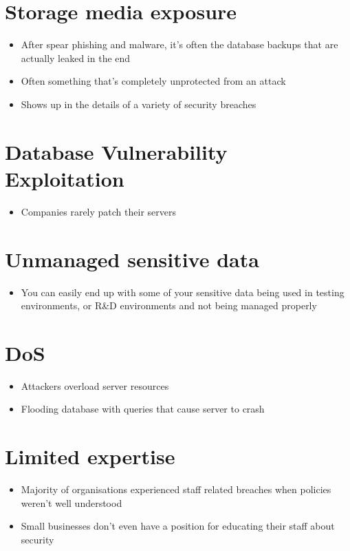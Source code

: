 \documentclass{article}[18pt]
\begin{document}
\section{Storage media exposure}
\begin{itemize}
	\item After spear phishing and malware, it's often the database backups that are actually leaked in the end
	\item Often something that's completely unprotected from an attack
	\item Shows up in the details of a variety of security breaches
\end{itemize}
\section{Database Vulnerability Exploitation}
\begin{itemize}
	\item Companies rarely patch their servers
\end{itemize}
\section{Unmanaged sensitive data}
\begin{itemize}
	\item You can easily end up with some of your sensitive data being used in testing environments, or R\&D environments and not being managed properly
\end{itemize}
\section{DoS}
\begin{itemize}
	\item Attackers overload server resources
	\item Flooding database with queries that cause server to crash
\end{itemize}
\section{Limited expertise}
\begin{itemize}
	\item Majority of organisations experienced staff related breaches when policies weren't well understood
	\item Small businesses don't even have a position for educating their staff about security
\end{itemize}
\end{document}
